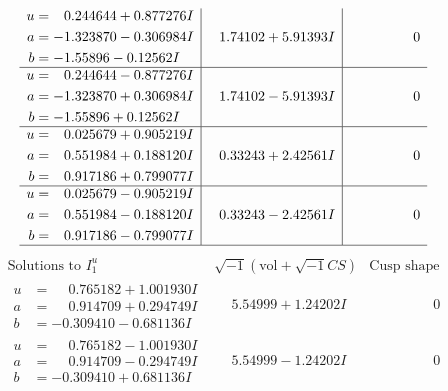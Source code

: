 \documentclass[1p]{elsarticle_modified}
\theoremstyle{definition}
\newcommand{\I}{\sqrt{-1}}
\begin{document}
$$\begin{array}{c|c|c}
\begin{aligned}
u &= \phantom{-}0.244644 + 0.877276 I \\
a &= -1.323870 - 0.306984 I \\
b &= -1.55896 - 0.12562 I\end{aligned}
 & \phantom{-}1.74102 + 5.91393 I & \phantom{-0.000000 } 0 \\ \hline\begin{aligned}
u &= \phantom{-}0.244644 - 0.877276 I \\
a &= -1.323870 + 0.306984 I \\
b &= -1.55896 + 0.12562 I\end{aligned}
 & \phantom{-}1.74102 - 5.91393 I & \phantom{-0.000000 } 0 \\ \hline\begin{aligned}
u &= \phantom{-}0.025679 + 0.905219 I \\
a &= \phantom{-}0.551984 + 0.188120 I \\
b &= \phantom{-}0.917186 + 0.799077 I\end{aligned}
 & \phantom{-}0.33243 + 2.42561 I & \phantom{-0.000000 } 0 \\ \hline\begin{aligned}
u &= \phantom{-}0.025679 - 0.905219 I \\
a &= \phantom{-}0.551984 - 0.188120 I \\
b &= \phantom{-}0.917186 - 0.799077 I\end{aligned}
 & \phantom{-}0.33243 - 2.42561 I & \phantom{-0.000000 } 0\\
 \hline 
 \end{array}$$\newpage$$\begin{array}{c|c|c}  
\text{Solutions to }I^u_{1}& \I (\text{vol} + \sqrt{-1}CS) & \text{Cusp shape}\\
 \hline 
\begin{aligned}
u &= \phantom{-}0.765182 + 1.001930 I \\
a &= \phantom{-}0.914709 + 0.294749 I \\
b &= -0.309410 - 0.681136 I\end{aligned}
 & \phantom{-}5.54999 + 1.24202 I & \phantom{-0.000000 } 0 \\ \hline\begin{aligned}
u &= \phantom{-}0.765182 - 1.001930 I \\
a &= \phantom{-}0.914709 - 0.294749 I \\
b &= -0.309410 + 0.681136 I\end{aligned}
 & \phantom{-}5.54999 - 1.24202 I & \phantom{-0.000000 } 0 \\ \hline\begin{aligned}

\end{aligned}
\end{array}$$
\end{document}
